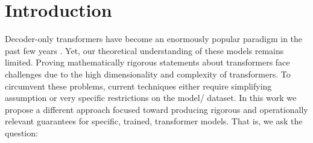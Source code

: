\section{Introduction}

Decoder-only transformers \cite{vaswani2023attentionneed} have become an enormously popular paradigm in the past few years \cite{geminiteam2024geminifamilyhighlycapable, openai2024gpt4technicalreport, Li_2022}.
Yet, our theoretical understanding of these models remains limited.
Proving mathematically rigorous statements about transformers face challenges due to the high dimensionality and complexity of transformers.
To circumvent these problems, current techniques either require simplifying assumption or very specific restrictions on the model/ dataset. 
In this work we propose a different approach focused toward producing rigorous and operationally relevant guarantees for specific, trained, transformer models.
That is, we ask the question:

